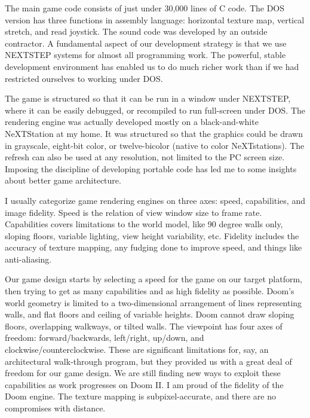 The main game code consists of
just under 30,000
lines of C code. The
DOS version has three functions in assembly language: horizontal texture map, vertical stretch, and read
joystick. The sound code was developed by an outside contractor. A fundamental aspect of our development
strategy is that we use NEXTSTEP systems
for almost all programming
work. The powerful, stable development environment has enabled us to
do much richer work than if we had restricted ourselves to working under DOS.\\
\par
The game is structured so that it can be run in a window under NEXTSTEP, where it can be easily debugged, or recompiled to run full-screen under DOS. The rendering engine was actually developed mostly on a black-and-white NeXTStation at my home. It was structured so that the graphics could be drawn in grayscale, eight-bit color, or twelve-bicolor (native to color NeXTstations). The refresh can also be used at any resolution, not limited to the PC screen size. Imposing the discipline of developing portable code has led me to some insights about better game architecture.\\
\par

I usually categorize game rendering engines on three axes: speed, capabilities, and image fidelity. Speed is the relation of view window size to frame rate. Capabilities covers limitations to the world model, like 90 degree walls only, sloping floors, variable lighting, view height variability, etc. Fidelity includes the accuracy of texture mapping, any fudging done to improve speed, and things like anti-aliasing.\\
\par

Our game design starts by selecting a speed for the game on our target platform, then trying to get as many capabilities and as high fidelity as possible. Doom's world geometry is limited to a two-dimensional arrangement of lines representing walls, and flat floors and ceiling of variable heights. Doom cannot draw sloping floors, overlapping walkways, or tilted walls. The viewpoint has four axes of freedom: forward/backwards, left/right, up/down, and clockwise/counterclockwise. These are significant limitations for, say, an architectural walk-through program, but they provided us with a great deal of freedom for our game design. We are still finding new ways to exploit these capabilities as work progresses on Doom II. I am proud of the fidelity of the Doom engine. The texture mapping is subpixel-accurate, and there are no compromises with distance.\\
\par

